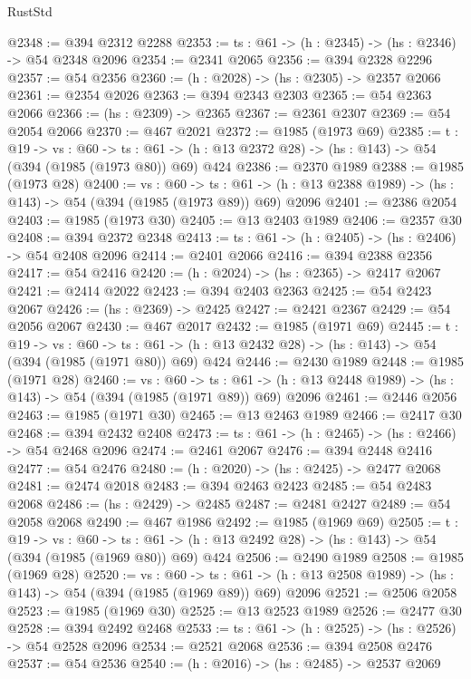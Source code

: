 \begin{lexlean}{RustStd}
\begin{coremodule}
{\begin{coremodule}
{{{{{{{{@2348 := @394 @2312 @2288
@2353 := {ts : @61} -> (h : @2345) -> (hs : @2346) -> @54 @2348 @2096
@2354 := @2341 @2065
@2356 := @394 @2328 @2296
@2357 := @54 @2356
@2360 := (h : @2028) -> (hs : @2305) -> @2357 @2066
@2361 := @2354 @2026
@2363 := @394 @2343 @2303
@2365 := @54 @2363 @2066
@2366 := (hs : @2309) -> @2365
@2367 := @2361 @2307
@2369 := @54 @2054 @2066
@2370 := @467 @2021
@2372 := @1985 (@1973 @69)
@2385 := {t : @19} ->
  {vs : @60} ->
  {ts : @61} -> (h : @13 @2372 @28) -> (hs : @143) -> @54 (@394 (@1985 (@1973 @80)) @69) @424
@2386 := @2370 @1989
@2388 := @1985 (@1973 @28)
@2400 := {vs : @60} ->
  {ts : @61} -> (h : @13 @2388 @1989) -> (hs : @143) -> @54 (@394 (@1985 (@1973 @89)) @69) @2096
@2401 := @2386 @2054
@2403 := @1985 (@1973 @30)
@2405 := @13 @2403 @1989
@2406 := @2357 @30
@2408 := @394 @2372 @2348
@2413 := {ts : @61} -> (h : @2405) -> (hs : @2406) -> @54 @2408 @2096
@2414 := @2401 @2066
@2416 := @394 @2388 @2356
@2417 := @54 @2416
@2420 := (h : @2024) -> (hs : @2365) -> @2417 @2067
@2421 := @2414 @2022
@2423 := @394 @2403 @2363
@2425 := @54 @2423 @2067
@2426 := (hs : @2369) -> @2425
@2427 := @2421 @2367
@2429 := @54 @2056 @2067
@2430 := @467 @2017
@2432 := @1985 (@1971 @69)
@2445 := {t : @19} ->
  {vs : @60} ->
  {ts : @61} -> (h : @13 @2432 @28) -> (hs : @143) -> @54 (@394 (@1985 (@1971 @80)) @69) @424
@2446 := @2430 @1989
@2448 := @1985 (@1971 @28)
@2460 := {vs : @60} ->
  {ts : @61} -> (h : @13 @2448 @1989) -> (hs : @143) -> @54 (@394 (@1985 (@1971 @89)) @69) @2096
@2461 := @2446 @2056
@2463 := @1985 (@1971 @30)
@2465 := @13 @2463 @1989
@2466 := @2417 @30
@2468 := @394 @2432 @2408
@2473 := {ts : @61} -> (h : @2465) -> (hs : @2466) -> @54 @2468 @2096
@2474 := @2461 @2067
@2476 := @394 @2448 @2416
@2477 := @54 @2476
@2480 := (h : @2020) -> (hs : @2425) -> @2477 @2068
@2481 := @2474 @2018
@2483 := @394 @2463 @2423
@2485 := @54 @2483 @2068
@2486 := (hs : @2429) -> @2485
@2487 := @2481 @2427
@2489 := @54 @2058 @2068
@2490 := @467 @1986
@2492 := @1985 (@1969 @69)
@2505 := {t : @19} ->
  {vs : @60} ->
  {ts : @61} -> (h : @13 @2492 @28) -> (hs : @143) -> @54 (@394 (@1985 (@1969 @80)) @69) @424
@2506 := @2490 @1989
@2508 := @1985 (@1969 @28)
@2520 := {vs : @60} ->
  {ts : @61} -> (h : @13 @2508 @1989) -> (hs : @143) -> @54 (@394 (@1985 (@1969 @89)) @69) @2096
@2521 := @2506 @2058
@2523 := @1985 (@1969 @30)
@2525 := @13 @2523 @1989
@2526 := @2477 @30
@2528 := @394 @2492 @2468
@2533 := {ts : @61} -> (h : @2525) -> (hs : @2526) -> @54 @2528 @2096
@2534 := @2521 @2068
@2536 := @394 @2508 @2476
@2537 := @54 @2536
@2540 := (h : @2016) -> (hs : @2485) -> @2537 @2069
}}}}}}}}
\end{coremodule}}
\end{coremodule}
\end{lexlean}
